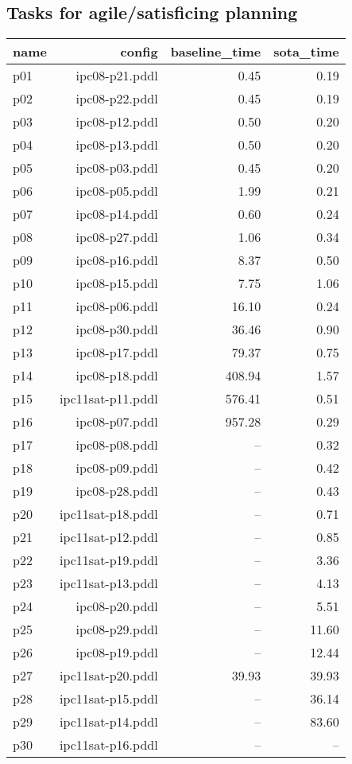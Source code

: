 \documentclass{article}
\begin{document}
                    \subsection*{Tasks for agile/satisficing planning}
                    
                            \begin{center}
                            \scriptsize
                            \begin{tabular}{@{}l|r|r|r@{}}
                            name & config & baseline\_time & sota\_time\\\midrule
                              p01& ipc08-p21.pddl&0.45&0.19\\
  p02& ipc08-p22.pddl&0.45&0.19\\
  p03& ipc08-p12.pddl&0.50&0.20\\
  p04& ipc08-p13.pddl&0.50&0.20\\
  p05& ipc08-p03.pddl&0.45&0.20\\
  p06& ipc08-p05.pddl&1.99&0.21\\
  p07& ipc08-p14.pddl&0.60&0.24\\
  p08& ipc08-p27.pddl&1.06&0.34\\
  p09& ipc08-p16.pddl&8.37&0.50\\
  p10& ipc08-p15.pddl&7.75&1.06\\
  p11& ipc08-p06.pddl&16.10&0.24\\
  p12& ipc08-p30.pddl&36.46&0.90\\
  p13& ipc08-p17.pddl&79.37&0.75\\
  p14& ipc08-p18.pddl&408.94&1.57\\
  p15& ipc11sat-p11.pddl&576.41&0.51\\
  p16& ipc08-p07.pddl&957.28&0.29\\
  p17& ipc08-p08.pddl&--&0.32\\
  p18& ipc08-p09.pddl&--&0.42\\
  p19& ipc08-p28.pddl&--&0.43\\
  p20& ipc11sat-p18.pddl&--&0.71\\
  p21& ipc11sat-p12.pddl&--&0.85\\
  p22& ipc11sat-p19.pddl&--&3.36\\
  p23& ipc11sat-p13.pddl&--&4.13\\
  p24& ipc08-p20.pddl&--&5.51\\
  p25& ipc08-p29.pddl&--&11.60\\
  p26& ipc08-p19.pddl&--&12.44\\
  p27& ipc11sat-p20.pddl&39.93&39.93\\
  p28& ipc11sat-p15.pddl&--&36.14\\
  p29& ipc11sat-p14.pddl&--&83.60\\
  p30& ipc11sat-p16.pddl&--&--
                            \end{tabular}
                            \end{center}
                    
\end{document}

